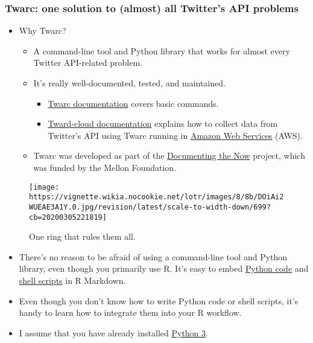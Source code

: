 \documentclass[
]{book}
\providecommand{\tightlist}{%
  \setlength{\itemsep}{0pt}\setlength{\parskip}{0pt}}
\begin{document}
\hypertarget{twarc-one-solution-to-almost-all-twitters-api-problems}{%
\subsubsection{Twarc: one solution to (almost) all Twitter's API problems}\label{twarc-one-solution-to-almost-all-twitters-api-problems}}

\begin{itemize}
\item
  Why Twarc?

  \begin{itemize}
  \item
    A command-line tool and Python library that works for almost every Twitter API-related problem.
  \item
    It's really well-documented, tested, and maintained.

    \begin{itemize}
    \tightlist
    \item
      \href{https://scholarslab.github.io/learn-twarc/06-twarc-command-basics}{Twarc documentation} covers basic commands.
    \item
      \href{https://twarc-cloud.readthedocs.io/_/downloads/en/stable/pdf/}{Tward-cloud documentation} explains how to collect data from Twitter's API using Twarc running in \href{https://aws.amazon.com/}{Amazon Web Services} (AWS).
    \end{itemize}
  \item
    Twarc was developed as part of the \href{https://www.docnow.io/}{Documenting the Now} project, which was funded by the Mellon Foundation.
  \end{itemize}
\end{itemize}

\begin{figure}
\centering
\texttt{[image: https://vignette.wikia.nocookie.net/lotr/images/8/8b/DOiAi2WUEAE3A1Y.0.jpg/revision/latest/scale-to-width-down/699?cb=20200305221819]}
\caption{One ring that rules them all.}
\end{figure}

\begin{itemize}
\item
  There's no reason to be afraid of using a command-line tool and Python library, even though you primarily use R. It's easy to embed \href{https://bookdown.org/yihui/rmarkdown/language-engines.html\#python}{Python code} and \href{https://bookdown.org/yihui/rmarkdown/language-engines.html\#shell-scripts}{shell scripts} in R Markdown.
\item
  Even though you don't know how to write Python code or shell scripts, it's handy to learn how to integrate them into your R workflow.
\item
  I assume that you have already installed \href{https://www.python.org/download/releases/3.0/}{Python 3}.
\end{itemize}
\end{document}
